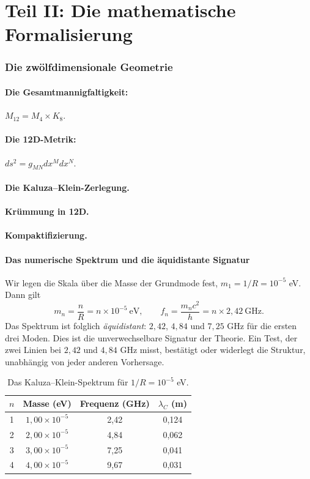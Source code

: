 \part*{Teil II: Die mathematische Formalisierung}

\section{Die zwölfdimensionale Geometrie}
\subsection{Die Gesamtmannigfaltigkeit:} $M_{12} = M_4 \times K_8$.
\subsection{Die 12D-Metrik:} $ds^2 = g_{MN} dx^M dx^N$.
\subsection{Die Kaluza--Klein-Zerlegung.}
\subsection{Krümmung in 12D.}
\subsection{Kompaktifizierung.}

\subsection{Das numerische Spektrum und die äquidistante Signatur}
Wir legen die Skala über die Masse der Grundmode fest, $m_1 = 1/R = 10^{-5}$ eV. Dann gilt
\begin{equation}
m_n = \frac{n}{R} = n \times 10^{-5}\ \text{eV},
\qquad
f_n = \frac{m_n c^2}{h} = n \times 2,42\ \text{GHz}.
\end{equation}
Das Spektrum ist folglich \emph{äquidistant}: $2,42$, $4,84$ und $7,25$ GHz für die ersten drei Moden. Dies ist die unverwechselbare Signatur der Theorie. Ein Test, der zwei Linien bei $2,42$ und $4,84$ GHz misst, bestätigt oder widerlegt die Struktur, unabhängig von jeder anderen Vorhersage.

\begin{table}[H]
\centering
\begin{tabular}{@{}cccc@{}}
\toprule
$n$ & Masse (eV) & Frequenz (GHz) & $\lambda_C$ (m) \\ \midrule
1 & $1,00\times10^{-5}$ & 2,42 & 0,124 \\
2 & $2,00\times10^{-5}$ & 4,84 & 0,062 \\
3 & $3,00\times10^{-5}$ & 7,25 & 0,041 \\
4 & $4,00\times10^{-5}$ & 9,67 & 0,031 \\ \bottomrule
\end{tabular}
\caption{Das Kaluza--Klein-Spektrum für $1/R = 10^{-5}$ eV.}
\label{tab:spectru}
\end{table}

